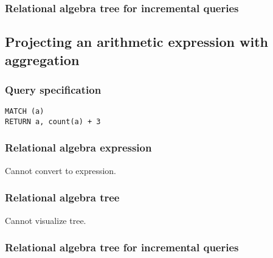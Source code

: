
\subsubsection*{Relational algebra tree for incremental queries}


\subsection{Projecting an arithmetic expression with aggregation}

\subsubsection*{Query specification}

\begin{lstlisting}
MATCH (a)
RETURN a, count(a) + 3
\end{lstlisting}

\subsubsection*{Relational algebra expression}

Cannot convert to expression.

\subsubsection*{Relational algebra tree}

Cannot visualize tree.

\subsubsection*{Relational algebra tree for incremental queries}


